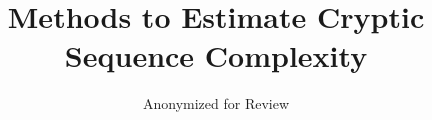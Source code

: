 \title{ Methods to Estimate Cryptic Sequence Complexity }

\author[1]{Anonymized for Review}


\maketitle
